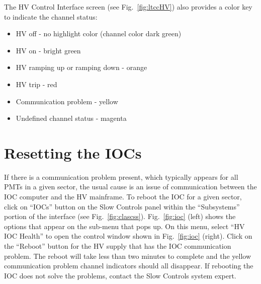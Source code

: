 \documentclass{article}
\begin{document}
The HV Control Interface screen (see Fig.~\ref{fig:ltccHV}) also provides a color key to indicate 
the channel status:

\begin{itemize}
\item HV off - no highlight color (channel color dark green)
\item HV on - bright green
\item HV ramping up or ramping down - orange
\item HV trip - red
\item Communication problem - yellow
\item Undefined channel status - magenta
\end{itemize}

\clearpage

\section{Resetting the IOCs}
\label{reset-iocs}

If there is a communication problem present, which typically appears for all PMTs in a given sector,
the usual cause is an issue of communication between the IOC computer and the HV mainframe. To reboot 
the IOC for a given sector, click on ``IOCs'' button on the Slow Controls panel within the ``Subsystems'' 
portion of the interface (see Fig.~\ref{fig:clascss}). Fig.~\ref{fig:ioc} (left) shows the options that 
appear on the sub-menu that pops up. On this menu, select ``HV IOC Health'' to open the control window 
shown in Fig.~\ref{fig:ioc} (right). Click on the ``Reboot'' button for the HV supply that has the IOC 
communication problem. The reboot will take less than two minutes to complete and the yellow 
communication problem channel indicators should all disappear. If 
rebooting the IOC does not solve the problems, contact the Slow Controls system expert.
\end{document}
